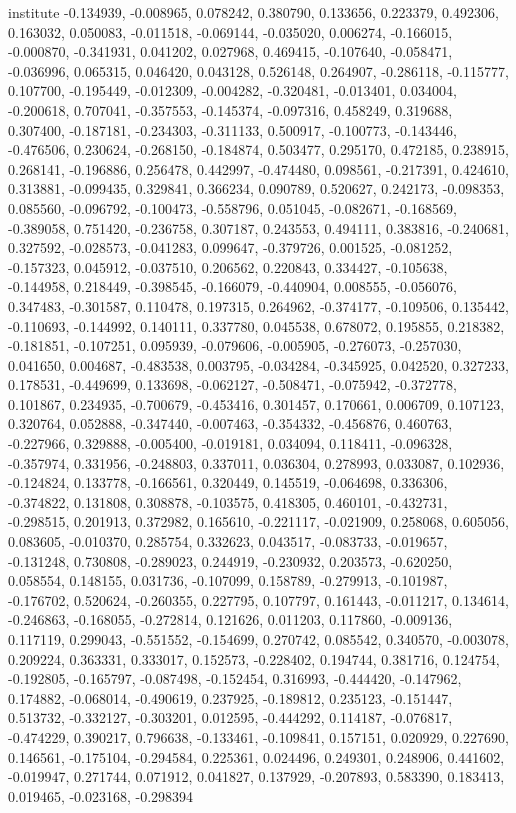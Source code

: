 \documentclass[11pt,a4paper]{article}
\begin{document}
\small
\noindent institute -0.134939, -0.008965, 0.078242, 0.380790, 0.133656, 0.223379, 0.492306, 0.163032, 0.050083, -0.011518, -0.069144, -0.035020, 0.006274, -0.166015, -0.000870, -0.341931, 0.041202, 0.027968, 0.469415, -0.107640, -0.058471, -0.036996, 0.065315, 0.046420, 0.043128, 0.526148, 0.264907, -0.286118, -0.115777, 0.107700, -0.195449, -0.012309, -0.004282, -0.320481, -0.013401, 0.034004, -0.200618, 0.707041, -0.357553, -0.145374, -0.097316, 0.458249, 0.319688, 0.307400, -0.187181, -0.234303, -0.311133, 0.500917, -0.100773, -0.143446, -0.476506, 0.230624, -0.268150, -0.184874, 0.503477, 0.295170, 0.472185, 0.238915, 0.268141, -0.196886, 0.256478, 0.442997, -0.474480, 0.098561, -0.217391, 0.424610, 0.313881, -0.099435, 0.329841, 0.366234, 0.090789, 0.520627, 0.242173, -0.098353, 0.085560, -0.096792, -0.100473, -0.558796, 0.051045, -0.082671, -0.168569, -0.389058, 0.751420, -0.236758, 0.307187, 0.243553, 0.494111, 0.383816, -0.240681, 0.327592, -0.028573, -0.041283, 0.099647, -0.379726, 0.001525, -0.081252, -0.157323, 0.045912, -0.037510, 0.206562, 0.220843, 0.334427, -0.105638, -0.144958, 0.218449, -0.398545, -0.166079, -0.440904, 0.008555, -0.056076, 0.347483, -0.301587, 0.110478, 0.197315, 0.264962, -0.374177, -0.109506, 0.135442, -0.110693, -0.144992, 0.140111, 0.337780, 0.045538, 0.678072, 0.195855, 0.218382, -0.181851, -0.107251, 0.095939, -0.079606, -0.005905, -0.276073, -0.257030, 0.041650, 0.004687, -0.483538, 0.003795, -0.034284, -0.345925, 0.042520, 0.327233, 0.178531, -0.449699, 0.133698, -0.062127, -0.508471, -0.075942, -0.372778, 0.101867, 0.234935, -0.700679, -0.453416, 0.301457, 0.170661, 0.006709, 0.107123, 0.320764, 0.052888, -0.347440, -0.007463, -0.354332, -0.456876, 0.460763, -0.227966, 0.329888, -0.005400, -0.019181, 0.034094, 0.118411, -0.096328, -0.357974, 0.331956, -0.248803, 0.337011, 0.036304, 0.278993, 0.033087, 0.102936, -0.124824, 0.133778, -0.166561, 0.320449, 0.145519, -0.064698, 0.336306, -0.374822, 0.131808, 0.308878, -0.103575, 0.418305, 0.460101, -0.432731, -0.298515, 0.201913, 0.372982, 0.165610, -0.221117, -0.021909, 0.258068, 0.605056, 0.083605, -0.010370, 0.285754, 0.332623, 0.043517, -0.083733, -0.019657, -0.131248, 0.730808, -0.289023, 0.244919, -0.230932, 0.203573, -0.620250, 0.058554, 0.148155, 0.031736, -0.107099, 0.158789, -0.279913, -0.101987, -0.176702, 0.520624, -0.260355, 0.227795, 0.107797, 0.161443, -0.011217, 0.134614, -0.246863, -0.168055, -0.272814, 0.121626, 0.011203, 0.117860, -0.009136, 0.117119, 0.299043, -0.551552, -0.154699, 0.270742, 0.085542, 0.340570, -0.003078, 0.209224, 0.363331, 0.333017, 0.152573, -0.228402, 0.194744, 0.381716, 0.124754, -0.192805, -0.165797, -0.087498, -0.152454, 0.316993, -0.444420, -0.147962, 0.174882, -0.068014, -0.490619, 0.237925, -0.189812, 0.235123, -0.151447, 0.513732, -0.332127, -0.303201, 0.012595, -0.444292, 0.114187, -0.076817, -0.474229, 0.390217, 0.796638, -0.133461, -0.109841, 0.157151, 0.020929, 0.227690, 0.146561, -0.175104, -0.294584, 0.225361, 0.024496, 0.249301, 0.248906, 0.441602, -0.019947, 0.271744, 0.071912, 0.041827, 0.137929, -0.207893, 0.583390, 0.183413, 0.019465, -0.023168, -0.298394
\normalsize
\end{document}
